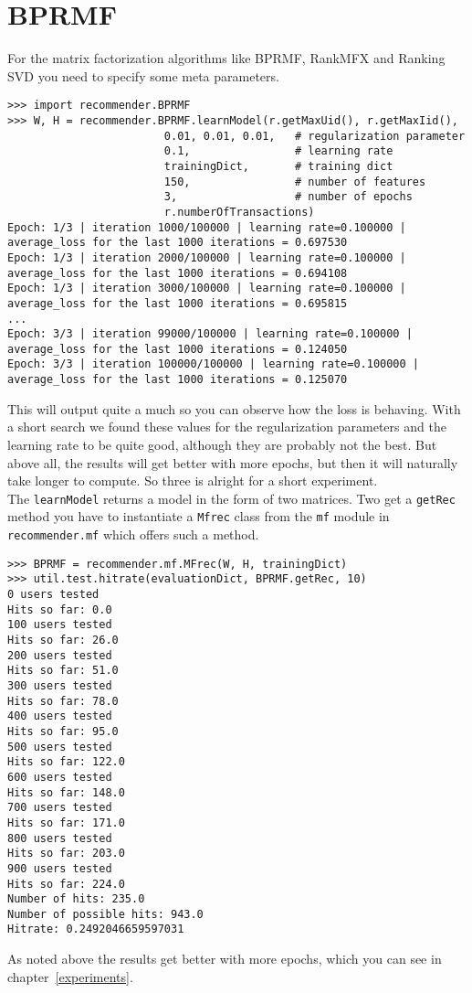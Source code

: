 \section{BPRMF}
For the matrix factorization algorithms like BPRMF, RankMFX
and Ranking SVD you need to specify some meta parameters.
\begin{lstlisting}[style=python]
>>> import recommender.BPRMF
>>> W, H = recommender.BPRMF.learnModel(r.getMaxUid(), r.getMaxIid(),
                        0.01, 0.01, 0.01,   # regularization parameter
                        0.1,                # learning rate
                        trainingDict,       # training dict
                        150,                # number of features
                        3,                  # number of epochs
                        r.numberOfTransactions)
Epoch: 1/3 | iteration 1000/100000 | learning rate=0.100000 | average_loss for the last 1000 iterations = 0.697530
Epoch: 1/3 | iteration 2000/100000 | learning rate=0.100000 | average_loss for the last 1000 iterations = 0.694108
Epoch: 1/3 | iteration 3000/100000 | learning rate=0.100000 | average_loss for the last 1000 iterations = 0.695815
...
Epoch: 3/3 | iteration 99000/100000 | learning rate=0.100000 | average_loss for the last 1000 iterations = 0.124050
Epoch: 3/3 | iteration 100000/100000 | learning rate=0.100000 | average_loss for the last 1000 iterations = 0.125070
\end{lstlisting}
This will output quite a much so you can observe how the loss is behaving.
With a short search we found these values for the regularization parameters
and the learning rate to be quite good, although they are probably not the
best. But above all, the results will get better with more epochs, but then
it will naturally take longer to compute. So three is alright for a short
experiment.\\
The \lstinline!learnModel! returns a model in the form of two matrices. Two get a 
\lstinline!getRec! method you have to instantiate a \lstinline!Mfrec! class from the \lstinline!mf! module
in \lstinline!recommender.mf! which offers such a method.
\begin{lstlisting}[style=python]
>>> BPRMF = recommender.mf.MFrec(W, H, trainingDict)
>>> util.test.hitrate(evaluationDict, BPRMF.getRec, 10)
0 users tested
Hits so far: 0.0
100 users tested
Hits so far: 26.0
200 users tested
Hits so far: 51.0
300 users tested
Hits so far: 78.0
400 users tested
Hits so far: 95.0
500 users tested
Hits so far: 122.0
600 users tested
Hits so far: 148.0
700 users tested
Hits so far: 171.0
800 users tested
Hits so far: 203.0
900 users tested
Hits so far: 224.0
Number of hits: 235.0
Number of possible hits: 943.0
Hitrate: 0.2492046659597031
\end{lstlisting}
As noted above the results get better with more epochs, which you can see
in chapter~\ref{experiments}.


